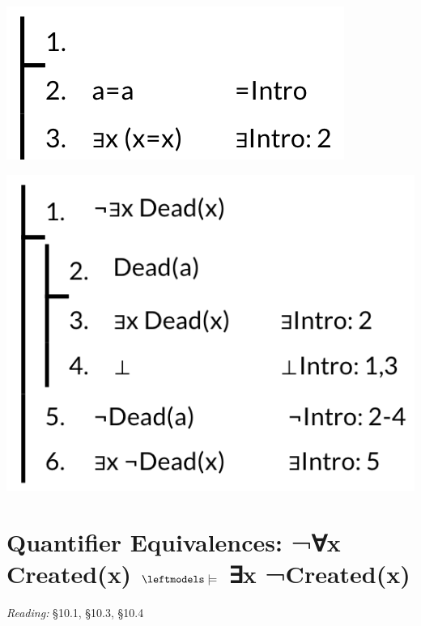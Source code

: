 \documentclass[12pt]{extarticle}
\begin{document}
\begin{multicols*}{3}
\begin{center}
\includegraphics[scale=0.3]{img/unit_605_prf1.png}
\end{center}
\begin{center}
\includegraphics[scale=0.3]{img/unit_605_prf2.png}
\end{center}
 
 
\section{Quantifier Equivalences: ¬∀x Created(x) $\leftmodels\models$ ∃x ¬Created(x)}
 
\emph{Reading:} §10.1, §10.3, §10.4
 

 


\end{multicols*}
\end{document}
